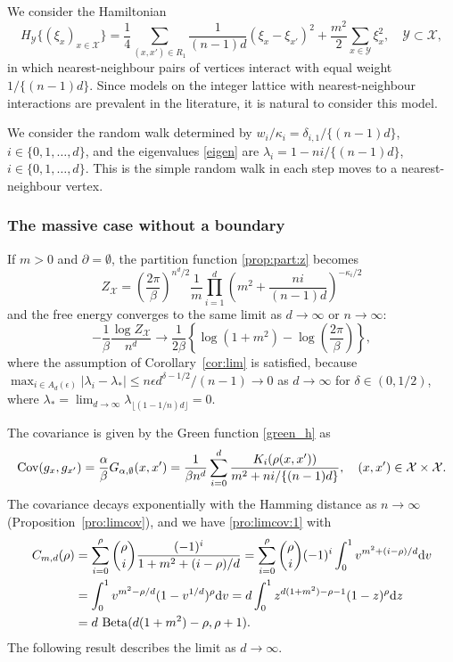 \documentclass[a4paper,11pt]{article}
\theoremstyle{plain}
\theoremstyle{definition}
\begin{document}
We consider the Hamiltonian
\begin{equation}\label{ham:simple}
  H_\mathcal{Y}\{(\xi_x)_{x\in\mathcal{X}}\}=\frac{1}{4}
  \sum_{(x,x')\in R_1}\frac{1}{(n-1)d}(\xi_x-\xi_{x'})^2
  +\frac{m^2}{2}\sum_{x\in\mathcal{Y}}\xi_x^2,
  \quad \mathcal{Y}\subset\mathcal{X},
\end{equation}
in which nearest-neighbour pairs of vertices interact with
equal weight $1/\{(n-1)d\}$. Since models on the integer
lattice with nearest-neighbour interactions are prevalent
in the literature, it is natural to consider this model.

We consider the random walk determined by
$w_i/\kappa_i=\delta_{i,1}/\{(n-1)d\}$,
$i\in\{0,1,\ldots,d\}$,
and the eigenvalues \eqref{eigen} are
$\lambda_i=1-ni/\{(n-1)d\}$, $i\in\{0,1,\ldots,d\}$.
This is the simple random walk in each step moves
to a nearest-neighbour vertex. 

\subsubsection{The massive case without a boundary}
\label{sect:model:nn:m}

If $m>0$ and $\partial=\emptyset$, the partition
function \eqref{prop:part:z} becomes
\[
  Z_\mathcal{X}=\left(\frac{2\pi}{\beta}\right)^{n^d/2}\frac{1}{m}
  \prod_{i=1}^d
  \left(m^2+\frac{ni}{(n-1)d}\right)^{-\kappa_i/2}
\]
and the free energy converges to the same limit as
$d\to\infty$ or $n\to\infty$:
\[
  -\frac{1}{\beta}\frac{\log Z_{\mathcal{X}}}{n^d}\to
  \frac{1}{2\beta}\left\{\log(1+m^2)-
  \log\left(\frac{2\pi}{\beta}\right)\right\},
\]
where the assumption of Corollary~\ref{cor:lim} is
satisfied, because
$\max_{i\in A_d(\epsilon)}|\lambda_i-\lambda_*|\le n\epsilon d^{\delta-1/2}/(n-1)\to 0$
as $d\to\infty$ for $\delta\in (0,1/2)$, where
$\lambda_*=\lim_{d\to\infty}\lambda_{\lfloor (1-1/n)d\rfloor}=0$.

The covariance is given by the Green function
\eqref{green_h} as
\begin{equation}\label{cov:simp}
  {\rm Cov}(g_x,g_{x'})=\frac{\alpha}{\beta}G_{\alpha,\emptyset}(x,x')=
  \frac{1}{\beta n^d}\sum_{i=0}^d
  \frac{K_i(\rho(x,x'))}{m^2+ni/\{(n-1)d\}}, \quad
  (x,x')\in\mathcal{X}\times\mathcal{X}.
\end{equation}
The covariance decays exponentially with the Hamming distance
as $n\to\infty$ (Proposition~\ref{pro:limcov}), and we
have \eqref{pro:limcov:1} with
\begin{align*}
  C_{m,d}(\rho)
  &=\sum_{i=0}^\rho\binom{\rho}{i}\frac{(-1)^i}{1+m^2+(i-\rho)/d}
  =\sum_{i=0}^\rho\binom{\rho}{i}(-1)^i
  \int_0^1v^{m^2+(i-\rho)/d}\mathrm{d}v\\
  &=\int_0^1 v^{m^2-\rho/d}(1-v^{1/d})^\rho \mathrm{d}v
  =d\int_0^1 z^{d(1+m^2)-\rho-1}(1-z)^\rho \mathrm{d}z\\
  &=d~{\rm Beta}(d(1+m^2)-\rho,\rho+1).
\end{align*}
The following result describes the limit as $d\to\infty$.
\end{document}
